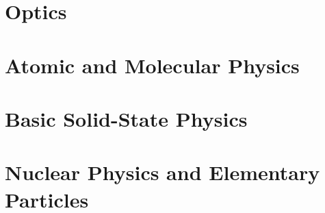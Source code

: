 \documentclass[fontsize=9pt,twoside]{scrbook}
\begin{document}
\part{Optics}






\part{Atomic and Molecular Physics}




\part{Basic Solid-State Physics}



\part{Nuclear Physics and Elementary Particles}



\backmatter
\end{document}

